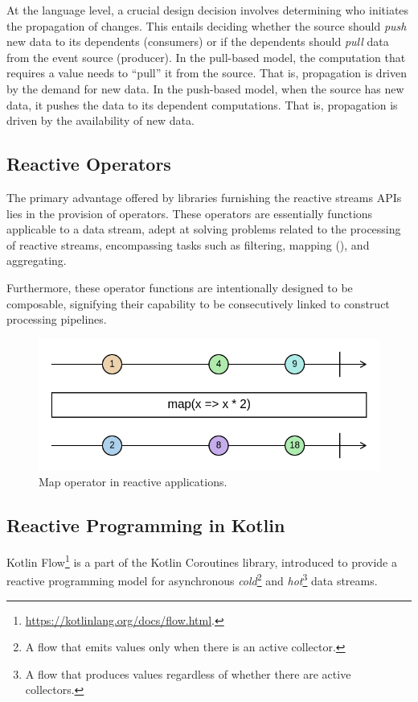 At the language level, a crucial design decision involves determining who initiates the propagation of changes. This entails deciding whether the source should \textit{push} new data to its dependents (consumers) or if the dependents should \textit{pull} data from the event source (producer). In the pull-based model, the computation that requires a value needs to ``pull'' it from the source. That is, propagation is driven by the demand for new data. In the push-based model, when the source has new data, it pushes the data to its dependent computations. That is, propagation is driven by the availability of new data.

\subsection{Reactive Operators}

The primary advantage offered by libraries furnishing the reactive streams APIs lies in the provision of operators. These operators are essentially functions applicable to a data stream, adept at solving problems related to the processing of reactive streams, encompassing tasks such as filtering, mapping (), and aggregating.

Furthermore, these operator functions are intentionally designed to be composable, signifying their capability to be consecutively linked to construct processing pipelines.

\begin{figure}
    \centering
    \includegraphics[width=\linewidth]{figures/map-marble.png}
    \caption{Map operator in reactive applications.}
    \label{fig:reactive-map}
\end{figure}

\subsection{Reactive Programming in Kotlin}

Kotlin Flow\footnote{\url{https://kotlinlang.org/docs/flow.html}.} is a part of the Kotlin Coroutines library, introduced to provide a reactive programming model for asynchronous \textit{cold}\footnote{A flow that emits values only when there is an active collector.} and \textit{hot}\footnote{A flow that produces values regardless of whether there are active collectors.} data streams.

